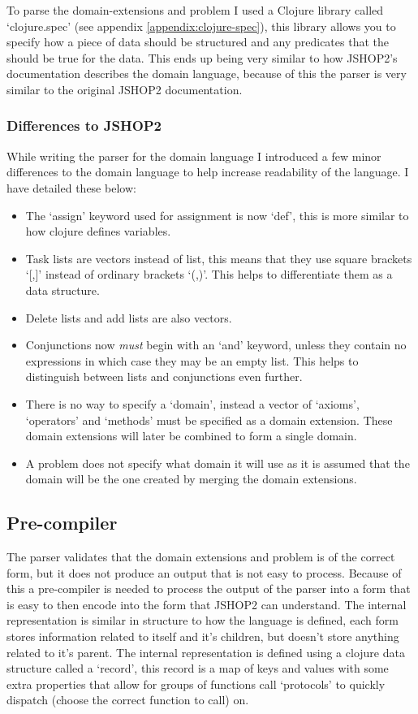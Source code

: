 To parse the domain-extensions and problem I used a Clojure library called
`clojure.spec' (see appendix \ref{appendix:clojure-spec}), this library allows
you to specify how a piece of data should be structured and any predicates that
the should be true for the data. This ends up being very similar to how JSHOP2's
documentation describes the domain language, because of this the parser is very
similar to the original JSHOP2 documentation.

\subsubsection{Differences to JSHOP2}
While writing the parser for the domain language I introduced a few minor
differences to the domain language to help increase readability of the language.
I have detailed these below:

\begin{itemize}
\item The `assign' keyword used for assignment is now `def', this is more
  similar to how clojure defines variables.
\item Task lists are vectors instead of list, this means that they use square
  brackets `[,]' instead of ordinary brackets `(,)'. This helps to differentiate
  them as a data structure.
\item Delete lists and add lists are also vectors.
\item Conjunctions now \emph{must} begin with an `and' keyword, unless they
  contain no expressions in which case they may be an empty list. This helps to
  distinguish between lists and conjunctions even further.
\item There is no way to specify a `domain', instead a vector of `axioms',
  `operators' and `methods' must be specified as a domain extension. These
  domain extensions will later be combined to form a single domain.
\item A problem does not specify what domain it will use as it is assumed that
  the domain will be the one created by merging the domain extensions.
\end{itemize}

\subsection{Pre-compiler}
The parser validates that the domain extensions and problem is of the correct
form, but it does not produce an output that is not easy to process. Because of
this a pre-compiler is needed to process the output of the parser into a form
that is easy to then encode into the form that JSHOP2 can understand. The
internal representation is similar in structure to how the language is defined,
each form stores information related to itself and it's children, but doesn't
store anything related to it's parent. The internal representation is defined
using a clojure data structure called a `record', this record is a map of keys
and values with some extra properties that allow for groups of functions call
`protocols' to quickly dispatch (choose the correct function to call) on.


